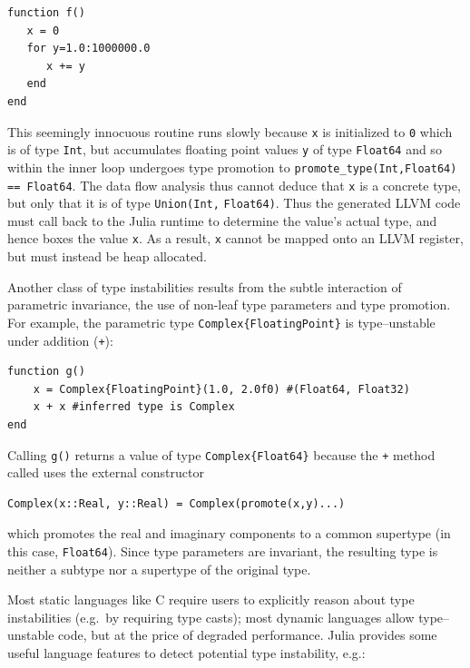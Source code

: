 \documentclass[pldi]{sigplanconf-pldi15}
\begin{document}
\begin{lstlisting}
function f()
   x = 0
   for y=1.0:1000000.0
      x += y
   end
end
\end{lstlisting}
%
This seemingly innocuous routine runs slowly because \verb|x| is initialized to
\verb|0| which is of type \verb|Int|, but accumulates floating point values
\verb|y| of type \verb|Float64| and so within the inner loop undergoes type
promotion to \verb|promote_type(Int,Float64)| \verb|== Float64|. The data flow
analysis thus cannot deduce that \verb|x| is a concrete type, but only that it
is of type \verb|Union(Int,| \verb|Float64)|. Thus the generated LLVM code must
call back to the Julia runtime to determine the value's actual type, and hence
boxes the value \verb|x|. As a result, \verb|x| cannot be mapped onto an LLVM
register, but must instead be heap allocated.

Another class of type instabilities results from the subtle interaction of
parametric invariance, the use of non-leaf type parameters and type promotion.
For example, the parametric type \verb|Complex{FloatingPoint}| is
type--unstable under addition (\verb|+|):

\begin{lstlisting}
function g()
    x = Complex{FloatingPoint}(1.0, 2.0f0) #(Float64, Float32)
    x + x #inferred type is Complex
end
\end{lstlisting}
%
Calling \verb|g()| returns a value of type \verb|Complex{Float64}| because the
\verb|+| method called uses the external constructor

\begin{lstlisting}
Complex(x::Real, y::Real) = Complex(promote(x,y)...)
\end{lstlisting}
%
which promotes the real and imaginary components to a common supertype (in this
case, \verb|Float64|). Since type parameters are invariant, the resulting type
is neither a subtype nor a supertype of the original type.

Most static languages like C require users to explicitly reason about type
instabilities (e.g.\ by requiring type casts); most dynamic languages allow
type--unstable code, but at the price of degraded performance. Julia provides
some useful language features to detect potential type instability, e.g.:
\end{document}
